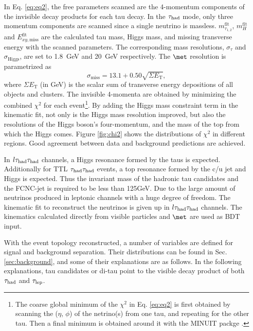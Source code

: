 In Eq. \ref{eq:eq2}, the free parameters scanned are the 4-momentum components of the invisible decay products for each tau decay. In the $\tau_\text{had}$ mode, only three momentum components are scanned since a single neutrino is massless. $m_{\tau_{1,2}}^{\text{fit}}$,  $m_{H}^{\text{fit}}$ and $E_{xy,\text{miss}}^{\text{fit}}$ are the calculated tau mass, Higgs mass, and missing transverse energy with the scanned parameters. The corresponding mass resolutions, $\sigma_{\tau}$ and $\sigma_{\text{Higgs}}$, are set to 1.8~GeV and 20~GeV respectively. The $\met$ resolution is parametrized as
\begin{equation}
\sigma_{\text{miss}}=13.1 + 0.50\sqrt{\Sigma E_\text{T}},
\label{eq:eq7}
\end{equation}
where $\Sigma E_\text{T}$ (in GeV) is the scalar sum of transverse energy depositions of all objects and clusters. The invisible 4-momenta are obtained by minimizing the combined $\chi^2$ for each event\footnote{
The coarse global minimum of the $\chi^2$ in Eq. \ref{eq:eq2} is first obtained by scanning the ($\eta$, $\phi$) of the netrino(s) from one tau, and repeating for the other tau. Then a final minimum is obtained around it with the MINUIT packge \cite{MINUIT}.
}. By adding the Higgs mass constraint term in the kinematic fit, not only is the Higgs mass resolution improved, but also the resolutions of the Higgs boson's four-momentum, and the mass of the top from which the Higgs comes. Figure \ref{fig:chi2} shows the distributions of $\chi^2$ in different regions. Good agreement between data and background predictions are achieved.



In $l\tau_\text{had}{}\tau_\text{had}$ channels, a Higgs resonance formed by the taus is expected. Additionally for TTL $\tau_\text{had}{}\tau_\text{had}$ events, a top resonance formed by the c/u jet and Higgs is expected. Thus the invariant mass of the hadronic tau candidates and the FCNC-jet is required to be less than 125GeV.
Due to the large amount of neutrinos produced in leptonic channels with a huge degree of freedom. The kinematic fit to reconstruct the neutrinos is given up in $l\tau_\text{had}{}\tau_\text{had}$ channels. The kinematics calculated directly from visible particles and $\met$ are used as BDT input.

With the event topology reconstructed, a number of variables are defined for signal and background separation. Their distributions can be found in Sec. \ref{sec:background}, and some of their explanations are as follows. In the following explanations, tau candidates or di-tau point to the visible decay product of both $\tau_\text{had}$ and $\tau_\text{lep}$.

